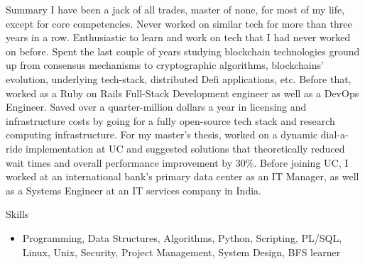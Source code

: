 \documentclass[]{mcdowellcv}
\begin{document}
\makeheader
      
\begin{cvsection}{Summary}
\hfill \break
I have been a jack of all trades, master of none, for most of my life, except for core competencies. Never worked on similar tech for more than three years in a row. Enthusiastic to learn and work on tech that I had never worked on before.\hfill \break \linebreak
Spent the last couple of years studying blockchain technologies ground up from consensus mechanisms to cryptographic algorithms, blockchains' evolution, underlying tech-stack, distributed Defi applications, etc. Before that, worked as a Ruby on Rails Full-Stack Development engineer as well as a DevOps Engineer. Saved over a quarter-million dollars a year in licensing and infrastructure costs by going for a fully open-source tech stack and research computing infrastructure.\hfill \break \linebreak
For my master's thesis, worked on a dynamic dial-a-ride implementation at UC and suggested solutions that theoretically reduced wait times and overall performance improvement by 30\%. Before joining UC, I worked at an international bank's primary data center as an IT Manager, as well as a Systems Engineer at an IT services company in India.
\end{cvsection}
\begin{cvsection}{Skills}
	\begin{cvsubsection}{}{}{}
		\begin{itemize}
			\item  Programming, Data Structures, Algorithms, Python, Scripting, PL/SQL, Linux, Unix, Security, Project Management, System Design, BFS learner
		\end{itemize}
	\end{cvsubsection}
\end{cvsection}
\end{document}
